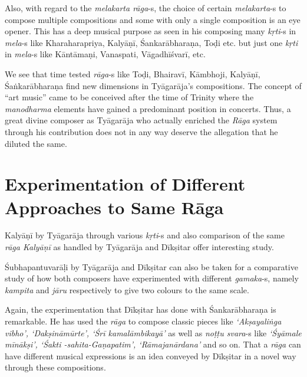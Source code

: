 Also, with regard to the \textit{melakarta rāga}-s, the choice of certain \textit{melakarta}-s to compose multiple compositions and some with only a single composition is an eye opener. This has a deep musical purpose as seen in his composing many \textit{kṛti}-s in \textit{mela}-s like Kharaharapriya, Kalyāṇī, Śankarābharaṇa, Toḍi etc. but just one \textit{kṛti} in \textit{mela}-s like Kāntāmaṇi, Vanaspati, Vāgadhīśvarī, etc.

We see that time tested \textit{rāga}-s like Toḍi, Bhairavī, Kāmbhoji, Kalyāṇī, Śaṅkarābharaṇa find new dimensions in Tyāgarāja’s compositions. The concept of “art music” came to be conceived after the time of Trinity where the \textit{manodharma} elements have gained a predominant position in concerts. Thus, a great divine composer as Tyāgarāja who actually enriched the \textit{Rāga} system through his contribution does not in any way deserve the allegation that he diluted the same.


\section*{Experimentation of Different Approaches to Same Rāga}

Kalyāṇī by Tyāgarāja through various \textit{kṛti}-s and also comparison of the same \textit{rāga Kalyāṇī} as handled by Tyāgarāja and Dīkṣitar offer interesting study.

Śubhapantuvarāḷi by Tyāgarāja and Dīkṣitar can also be taken for a comparative study of how both composers have experimented with different \textit{gamaka}-s, namely \textit{kampita} and \textit{jāru} respectively to give two colours to the same scale.

Again, the experimentation that Dīkṣitar has done with Śankarābhara\-ṇa is remarkable. He has used the \textit{rāga} to compose classic pieces like \textit{‘Akṣayaliṅga vibho’, ‘Dakṣināmūrte’, ‘Śrī kamalāmbikayā’} as well as \textit{noṭṭu svara}-s like \textit{‘Śyāmale mīnākṣi’, ‘Śakti -sahita-Gaṇapatim’, ‘Rāmajanārdana’} and so on. That a \textit{rāga} can have different musical expressions is an idea conveyed by Dīkṣitar in a novel way through these compositions.

